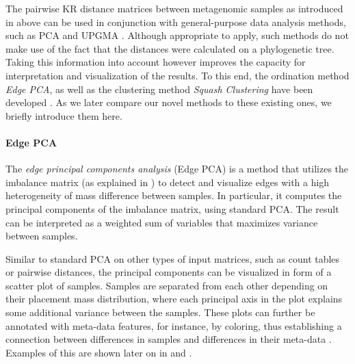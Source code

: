 The pairwise KR distance matrices between metagenomic samples as introduced
in  above
can be used in conjunction with general-purpose data analysis methods,
such as PCA \cite{Pearson1901,Jolliffe2002} and UPGMA \cite{Michener1957,Sokal1958,Legendre1998}.
Although appropriate to apply,
such methods do not make use of the fact that the distances were calculated on a phylogenetic tree.
Taking this information into account however improves the capacity for interpretation and visualization of the results.
To this end, the ordination method \emph{Edge PCA},
as well as the clustering method \emph{Squash Clustering} have been developed \cite{Matsen2011a}.
As we later compare our novel methods to these existing ones, we briefly introduce them here.


\paragraph{Edge PCA}
\label{ch:Foundations:sec:PhylogeneticPlacement:sub:ExistingMethods:par:EdgePCA}


The \emph{edge principal components analysis} (Edge PCA) \cite{Matsen2011a}
is a method that utilizes the imbalance matrix
(as explained in )
to detect and visualize edges with a high heterogeneity of mass difference between samples.
In particular, it computes the principal components of the imbalance matrix, using standard PCA.
The result can be interpreted as a weighted sum of variables that maximizes variance between samples.

Similar to standard PCA on other types of input matrices, such as count tables or pairwise distances,
the principal components can be visualized in form of a scatter plot of samples.
Samples are separated from each other depending on their placement mass distribution,
where each principal axis in the plot explains some additional variance between the samples.
These plots can further be annotated with meta-data features, for instance, by coloring,
thus establishing a connection between differences in samples and differences in their meta-data \cite{Srinivasan2012}.
Examples of this are shown later on in  and .

